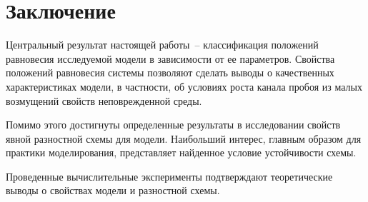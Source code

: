 
\section{Заключение}

Центральный результат настоящей работы~-- классификация положений равновесия исследуемой модели в зависимости от ее параметров. Свойства положений равновесия системы позволяют сделать выводы о качественных характеристиках модели, в частности, об условиях роста канала пробоя из малых возмущений свойств неповрежденной среды.

Помимо этого достигнуты определенные результаты в исследовании \linebreak свойств явной разностной схемы для модели. Наибольший интерес, главным образом для практики моделирования, представляет найденное условие устойчивости схемы.

Проведенные вычислительные эксперименты подтверждают теоретические выводы о свойствах модели и разностной схемы.